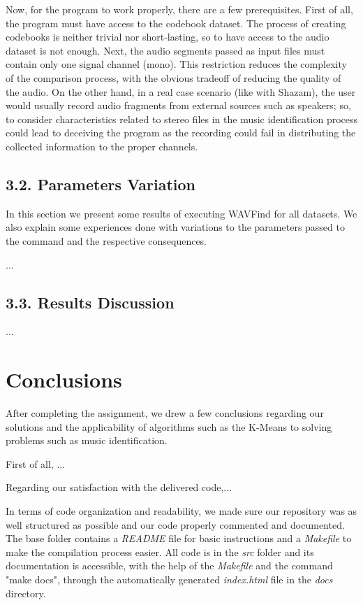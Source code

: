 \documentclass[12pt]{article}
\begin{document}
Now, for the program to work properly, there are a few prerequisites.
First of all, the program must have access to the codebook dataset.
The process of creating codebooks is neither trivial nor short-lasting, so to 
have access to the audio dataset is not enough.
Next, the audio segments passed as input files must contain only one signal 
channel (mono).
This restriction reduces the complexity of the comparison process, with the
obvious tradeoff of reducing the quality of the audio.
On the other hand, in a real case scenario (like with Shazam), the user would
usually record audio fragments from external sources such as speakers; so, to 
consider characteristics related to stereo files in the music identification 
process could lead to deceiving the program as the recording could fail in 
distributing the collected information to the proper channels.

\subsection*{3.2. Parameters Variation}

In this section we present some results of executing WAVFind for all datasets.
We also explain some experiences done with variations to the parameters passed
to the command and the respective consequences.

...

\subsection*{3.3. Results Discussion}

...

\newpage
\section*{Conclusions}

After completing the assignment, we drew a few conclusions regarding our 
solutions and the applicability of algorithms such as the K-Means to solving
problems such as music identification.

First of all, ...

Regarding our satisfaction with the delivered code,...

In terms of code organization and readability, we made sure our 
repository was as well structured as possible and our code properly commented
and documented.
The base folder contains a {\it README\/} file for basic instructions and a 
{\it Makefile\/} to make the compilation process easier.
All code is in the {\it src\/} folder and its documentation is accessible, 
with the help of the {\it Makefile\/} and the command "make docs", through
the automatically generated {\it index.html\/} file in the {\it docs\/} 
directory.
\end{document}
